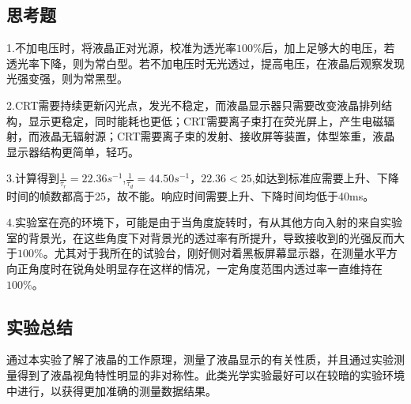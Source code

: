 \documentclass{report}
\begin{document}
	\subsection{思考题}
	1.不加电压时，将液晶正对光源，校准为透光率$ 100\% $后，加上足够大的电压，若透光率下降，则为常白型。若不加电压时无光透过，提高电压，在液晶后观察发现光强变强，则为常黑型。
	
	
	2.CRT需要持续更新闪光点，发光不稳定，而液晶显示器只需要改变液晶排列结构，显示更稳定，同时能耗也更低；CRT需要离子束打在荧光屏上，产生电磁辐射，而液晶无辐射源；CRT需要离子束的发射、接收屏等装置，体型笨重，液晶显示器结构更简单，轻巧。
	
	
	3.计算得到$ \frac{1}{\tau_r}=22.36s^{-1} $,$ \frac{1}{\tau_d}=44.50s^{-1} $，$ 22.36<25 $,如达到标准应需要上升、下降时间的帧数都高于25，故不能。响应时间需要上升、下降时间均低于40ms。
	
	
	4.实验室在亮的环境下，可能是由于当角度旋转时，有从其他方向入射的来自实验室的背景光，在这些角度下对背景光的透过率有所提升，导致接收到的光强反而大于$ 100\% $。尤其对于我所在的试验台，刚好侧对着黑板屏幕显示器，在测量水平方向正角度时在锐角处明显存在这样的情况，一定角度范围内透过率一直维持在$ 100\% $。
	\subsection{实验总结}
	通过本实验了解了液晶的工作原理，测量了液晶显示的有关性质，并且通过实验测量得到了液晶视角特性明显的非对称性。此类光学实验最好可以在较暗的实验环境中进行，以获得更加准确的测量数据结果。
\end{document}
